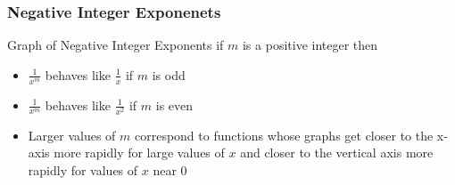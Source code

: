 \documentclass{beamer}
\begin{document}
\begin{frame}
  \frametitle{Negative Integer Exponenets}
  \begin{alertblock}{Graph of Negative Integer Exponents}
    if \(m\) is  a positive integer then
    \begin{itemize}
      \item \(\frac{1}{x^{m}}\) behaves like \(\frac{1}{x}\) if \(m\) is odd
      \item \(\frac{1}{x^{m}}\) behaves like \(\frac{1}{x^{2}}\) if \(m\) is even
      \item Larger values of \(m\) correspond to functions whose graphs get closer to the x-axis more rapidly for large values of \(x\)
      and closer to the vertical axis more rapidly for values of \(x\) near 0
    \end{itemize} 
  \end{alertblock}  

\end{frame}
\end{document}
